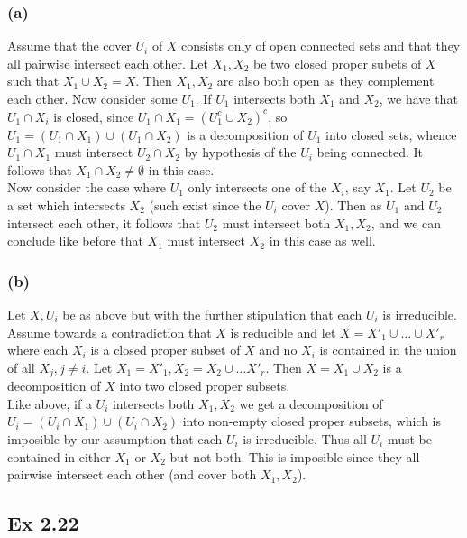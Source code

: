 \documentclass{article}
\theoremstyle{definition}
\begin{document}
\subsubsection*{(a)}

Assume that the cover $U_i$ of $X$ consists only of open connected sets and
that they all pairwise intersect each other. Let $X_1, X_2$ be two closed
proper subets of $X$ such that $X_1 \cup X_2 = X$. Then $X_1, X_2$ are also
both open as they complement each other. Now consider some $U_1$. If $U_1$
intersects both $X_1$ and $X_2$, we have that $U_1 \cap X_i$ is closed, since
$U_1 \cap X_1 = (U_1^{c} \cup X_2)^{c}$, so $U_1 = (U_1 \cap X_1) \cup (U_1
\cap X_2)$ is a decomposition of $U_1$ into closed sets, whence $U_1 \cap
X_1$ must intersect $U_2 \cap X_2$ by hypothesis of the $U_i$ being connected.
It follows that $X_1 \cap X_2 \not = \emptyset$ in this case. \\

Now consider the case where $U_1$ only intersects one of the $X_i$, say $X_1$.
Let $U_2$ be a set which intersects $X_2$ (such exist since the $U_i$ cover
$X$). Then as $U_1$ and $U_2$ intersect each other, it follows that $U_2$ must
intersect both $X_1, X_2$, and we can conclude like before that $X_1$ must
intersect $X_2$ in this case as well. 

\subsubsection*{(b)}

Let $X, U_i$ be as above but with the further stipulation that each $U_i$ is
irreducible. Assume towards a contradiction that $X$ is reducible and let $X =
X'_1 \cup \ldots \cup X'_r$ where each $X_i$ is a closed proper subset of $X$
and no $X_i$ is contained in the union of all $X_j, j \not = i$. Let $X_1 =
X'_1, X_2 = X_2 \cup \ldots X'_r$. Then $X = X_1 \cup X_2$ is a decomposition
of $X$ into two closed proper subsets. \\

Like above, if a $U_i$ intersects both $X_1, X_2$ we get a decomposition of
$U_i = (U_i \cap X_1) \cup (U_i \cap X_2)$ into non-empty closed proper
subsets, which is imposible by our assumption that each $U_i$ is irreducible.
Thus all $U_i$ must be contained in either $X_1$ or $X_2$ but not both. This is
imposible since they all pairwise intersect each other (and cover both $X_1,
X_2$). 


\subsection*{Ex 2.22}
\end{document}
